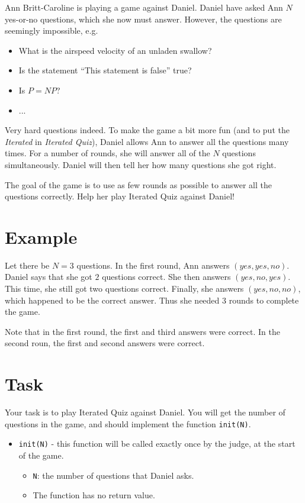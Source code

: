 \newcommand\version{v1}
Ann Britt-Caroline is playing a game against Daniel. Daniel have asked Ann $N$ yes-or-no questions, which she now must answer.
However, the questions are seemingly impossible, e.g.
\begin{itemize}
  \item What is the airspeed velocity of an unladen swallow?
  \item Is the statement ``This statement is false'' true?
  \item Is $P = NP$?
  \item ...
\end{itemize}
Very hard questions indeed. To make the game a bit more fun (and to put the \emph{Iterated} in \emph{Iterated Quiz}), Daniel allows Ann to answer all the questions
many times. For a number of rounds, she will answer all of the $N$ questions simultaneously. Daniel will then tell her how many questions she got right.

The goal of the game is to use as few rounds as possible to answer all the questions correctly.
Help her play Iterated Quiz against Daniel!

\section*{Example}
Let there be $N = 3$ questions. In the first round, Ann answers $(yes, yes, no)$. Daniel says that she got $2$ questions correct. She then answers $(yes, no, yes)$. This time, she still got two questions correct. Finally, she
answers $(yes, no, no)$, which happened to be the correct answer. Thus she needed 3 rounds to complete the game.

Note that in the first round, the first and third answers were correct. In the second roun, the first and second answers were correct.

\section*{Task}
Your task is to play Iterated Quiz against Daniel. You will get the number of questions in the game, and should implement the function \texttt{init(N)}.
\begin{itemize}
  \item \texttt{init(N)} - this function will be called exactly once by the judge, at the start of the game.
    \begin{itemize}
      \item \texttt{N}: the number of questions that Daniel asks.
      \item The function has no return value.
    \end{itemize}
\end{itemize}

